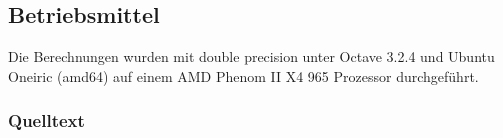 \documentclass{scrartcl}
\begin{document}
\subsection{Betriebsmittel}

Die Berechnungen wurden mit double precision unter Octave 3.2.4 und Ubuntu
Oneiric (amd64) auf einem AMD Phenom II X4 965 Prozessor durchgeführt.

\subsubsection{Quelltext}











\end{document}
